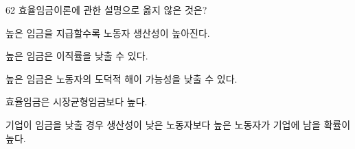 \begin{question}{62}
효율임금이론에 관한 설명으로 옳지 않은 것은?
\begin{choices}
  \item 높은 임금을 지급할수록 노동자 생산성이 높아진다.
  \item 높은 임금은 이직률을 낮출 수 있다.
  \item 높은 임금은 노동자의 도덕적 해이 가능성을 낮출 수 있다.
  \item 효율임금은 시장균형임금보다 높다.
  \item 기업이 임금을 낮출 경우 생산성이 낮은 노동자보다 높은 노동자가 기업에 남을 확률이 높다.
\end{choices}
\end{question}
